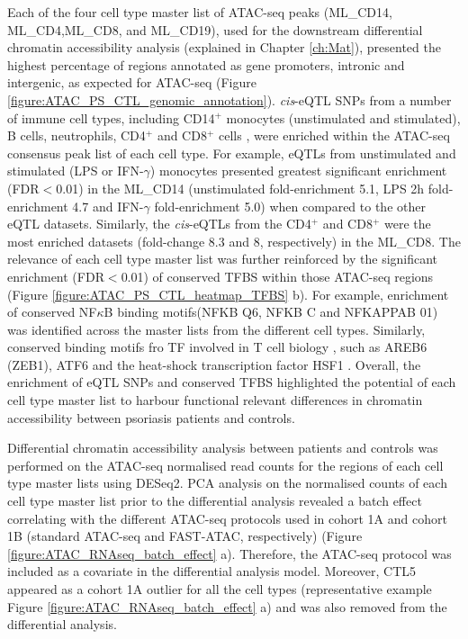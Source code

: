 Each of the four cell type master list of ATAC-seq peaks (ML\_CD14, ML\_CD4,ML\_CD8, and ML\_CD19), used for the downstream differential chromatin accessibility analysis (explained in Chapter \ref{ch:Mat}), presented the highest percentage of regions annotated as gene promoters, intronic and intergenic, as expected for ATAC-seq (Figure \ref{figure:ATAC_PS_CTL_genomic_annotation}). \textit{cis}-eQTL SNPs from a number of immune cell types, including CD14$^+$ monocytes (unstimulated and stimulated), B cells, neutrophils, CD4$^+$ and CD8$^+$ cells \parencite{Fairfax2012, Fairfax2014, Kasela2016}, were enriched within the ATAC-seq consensus peak list of each cell type. For example, eQTLs from unstimulated and stimulated (LPS or IFN-$\gamma$) monocytes presented greatest significant enrichment (FDR$<$0.01) in the ML\_CD14 (unstimulated fold-enrichment 5.1, LPS 2h fold-enrichment 4.7 and IFN-$\gamma$ fold-enrichment 5.0) when compared to the other eQTL datasets. Similarly, the \textit{cis}-eQTLs from the CD4$^+$ and CD8$^+$ were the most enriched datasets (fold-change 8.3 and 8, respectively) in the ML\_CD8. The relevance of each cell type master list was further reinforced by the significant enrichment (FDR$<$0.01) of conserved TFBS within those ATAC-seq regions (Figure \ref{figure:ATAC_PS_CTL_heatmap_TFBS} b). For example, enrichment of conserved NF$\kappa$B binding motifs(NFKB Q6, NFKB C and NFKAPPAB 01) was identified across the master lists from the different cell types. Similarly, conserved binding motifs fro TF involved in T cell biology , such as AREB6 (ZEB1), ATF6 and the heat-shock transcription factor HSF1 \parencite{Guan2018,Yamazaki2009,Gandhapudi2013}. 
Overall, the enrichment of eQTL SNPs and conserved TFBS highlighted the potential of each cell type master list to harbour functional relevant differences in chromatin accessibility between psoriasis patients and controls.

Differential chromatin accessibility analysis between patients and controls was performed on the ATAC-seq normalised read counts for the regions of each cell type master lists using DESeq2. PCA analysis on the normalised counts of each cell type master list prior to the differential analysis revealed a batch effect correlating with the different ATAC-seq protocols used in cohort 1A and cohort 1B (standard ATAC-seq and FAST-ATAC, respectively) (Figure \ref{figure:ATAC_RNAseq_batch_effect} a). Therefore, the ATAC-seq protocol was included as a covariate in the differential analysis model. Moreover, CTL5 appeared as a cohort 1A outlier for all the cell types (representative example Figure \ref{figure:ATAC_RNAseq_batch_effect} a) and was also removed from the differential analysis.

